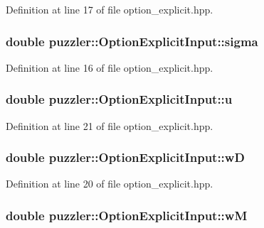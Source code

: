 Definition at line 17 of file option\+\_\+explicit.\+hpp.

\hypertarget{a00019_a56e89fa1af7238d063567f8e54e9b49d}{}
\subsubsection[{sigma}]{\setlength{\rightskip}{0pt plus 5cm}double puzzler\+::\+Option\+Explicit\+Input\+::sigma}\label{a00019_a56e89fa1af7238d063567f8e54e9b49d}


Definition at line 16 of file option\+\_\+explicit.\+hpp.

\hypertarget{a00019_af9884280ea6d8fc1e06250db7be0e992}{}
\subsubsection[{u}]{\setlength{\rightskip}{0pt plus 5cm}double puzzler\+::\+Option\+Explicit\+Input\+::u}\label{a00019_af9884280ea6d8fc1e06250db7be0e992}


Definition at line 21 of file option\+\_\+explicit.\+hpp.

\hypertarget{a00019_a2f19480aac3d3de9505fb5c6e167ae89}{}
\subsubsection[{w\+D}]{\setlength{\rightskip}{0pt plus 5cm}double puzzler\+::\+Option\+Explicit\+Input\+::w\+D}\label{a00019_a2f19480aac3d3de9505fb5c6e167ae89}


Definition at line 20 of file option\+\_\+explicit.\+hpp.

\hypertarget{a00019_a30eb51f7bebca47bbc6bcde042f0d26a}{}
\subsubsection[{w\+M}]{\setlength{\rightskip}{0pt plus 5cm}double puzzler\+::\+Option\+Explicit\+Input\+::w\+M}\label{a00019_a30eb51f7bebca47bbc6bcde042f0d26a}


